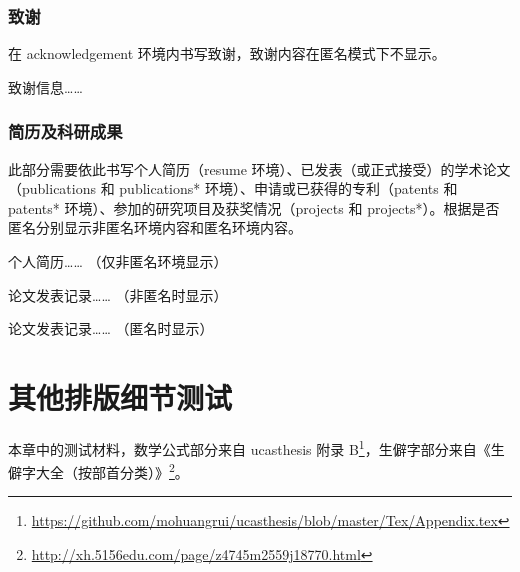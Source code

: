 \documentclass[master]{shtthesis}
\begin{document}
\subsection{致谢}
在 acknowledgement 环境内书写致谢，致谢内容在匿名模式下不显示。
\begin{latex}
\begin{acknowledgement}
  致谢信息……
\end{acknowledgement}
\end{latex}

\subsection{简历及科研成果}
此部分需要依此书写个人简历（resume 环境）、已发表（或正式接受）的学术论文（publications 和 publications* 环境）、申请或已获得的专利（patents 和 patents* 环境）、参加的研究项目及获奖情况（projects 和 projects*）。根据是否匿名分别显示非匿名环境内容和匿名环境内容。
\begin{latex}
\begin{resume}
  个人简历…… （仅非匿名环境显示）
\end{resume}

\begin{publications}
  论文发表记录…… （非匿名时显示）
\end{publications}

\begin{publications*}
  论文发表记录…… （匿名时显示）
\end{publications*}
\end{latex}

\makebiblio

\appendix
\chapter{其他排版细节测试}
本章中的测试材料，数学公式部分来自 \textsf{ucasthesis} 附录 B\footnote{\url{https://github.com/mohuangrui/ucasthesis/blob/master/Tex/Appendix.tex}}，生僻字部分来自《生僻字大全（按部首分类）》\footnote{\url{http://xh.5156edu.com/page/z4745m2559j18770.html}}。
\end{document}
